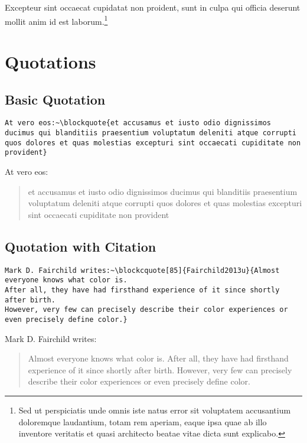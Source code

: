 \begin{center}
Excepteur sint occaecat cupidatat non proident, sunt in culpa qui officia deserunt mollit anim id est laborum.\footnote{Sed ut perspiciatis unde omnis iste natus error sit voluptatem accusantium doloremque laudantium, totam rem aperiam, eaque ipsa quae ab illo inventore veritatis et quasi architecto beatae vitae dicta sunt explicabo.}
\end{center}

\section*{Quotations}%
\label{sec:quotations}

\subsection*{Basic Quotation}%
\label{subsec:basic-quotation}

\begin{lstlisting}[caption={Basic quotation.}]
At vero eos:~\blockquote{et accusamus et iusto odio dignissimos ducimus qui blanditiis praesentium voluptatum deleniti atque corrupti quos dolores et quas molestias excepturi sint occaecati cupiditate non provident}
\end{lstlisting}

At vero eos:~\blockquote{et accusamus et iusto odio dignissimos ducimus qui blanditiis praesentium voluptatum deleniti atque corrupti quos dolores et quas molestias excepturi sint occaecati cupiditate non provident}

\subsection*{Quotation with Citation}%
\label{subsec:quotation-with-citation}

\begin{lstlisting}[caption={Quotation with Citation.}]
Mark D. Fairchild writes:~\blockcquote[85]{Fairchild2013u}{Almost everyone knows what color is.
After all, they have had firsthand experience of it since shortly after birth.
However, very few can precisely describe their color experiences or even precisely define color.}
\end{lstlisting}

Mark D. Fairchild writes:~\blockcquote[85]{Fairchild2013u}{Almost everyone knows what color is.
After all, they have had firsthand experience of it since shortly after birth.
However, very few can precisely describe their color experiences or even precisely define color.}

